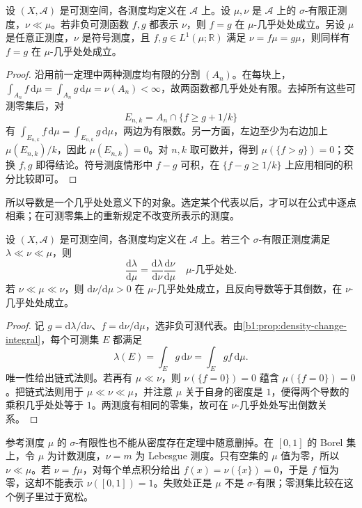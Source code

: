 \begin{proposition}\label{b1:prop:radon-nikodym-uniqueness}
设 \((X,\mathcal A)\) 是可测空间，各测度均定义在 \(\mathcal A\) 上。设 \(\mu,\nu\) 是 \(\mathcal A\) 上的 \(\sigma\)-有限正测度，\(\nu\ll\mu\)。若非负可测函数 \(f,g\) 都表示 \(\nu\)，则 \(f=g\) 在 \(\mu\)-几乎处处成立。另设 \(\mu\) 是任意正测度，\(\nu\) 是符号测度，且 \(f,g\in L^1(\mu;\mathbb R)\) 满足 \(\nu=f\mu=g\mu\)，则同样有 \(f=g\) 在 \(\mu\)-几乎处处成立。
\end{proposition}
\begin{proof}
沿用前一定理中两种测度均有限的分割 \((A_n)\)。在每块上，\(\int_{A_n}f\,\mathrm d\mu=\int_{A_n}g\,\mathrm d\mu=\nu(A_n)<\infty\)，故两函数都几乎处处有限。去掉所有这些可测零集后，对
\[
E_{n,k}=A_n\cap\{f\geq g+1/k\}
\]
有 \(\int_{E_{n,k}}f\,\mathrm d\mu=\int_{E_{n,k}}g\,\mathrm d\mu\)，两边为有限数。另一方面，左边至少为右边加上 \(\mu(E_{n,k})/k\)，因此 \(\mu(E_{n,k})=0\)。对 \(n,k\) 取可数并，得到 \(\mu(\{f>g\})=0\)；交换 \(f,g\) 即得结论。符号测度情形中 \(f-g\) 可积，在 \(\{f-g\geq1/k\}\) 上应用相同的积分比较即可。
\end{proof}

所以导数是一个几乎处处意义下的对象。选定某个代表以后，才可以在公式中逐点相乘；在可测零集上的重新规定不改变所表示的测度。

\begin{proposition}[密度的链式法则]\label{b1:prop:radon-nikodym-chain}
设 \((X,\mathcal A)\) 是可测空间，各测度均定义在 \(\mathcal A\) 上。若三个 \(\sigma\)-有限正测度满足 \(\lambda\ll\nu\ll\mu\)，则
\[
\frac{\mathrm d\lambda}{\mathrm d\mu}
=\frac{\mathrm d\lambda}{\mathrm d\nu}\frac{\mathrm d\nu}{\mathrm d\mu}
\quad\mu\text{-几乎处处}.
\]
若 \(\nu\ll\mu\ll\nu\)，则 \(\mathrm d\nu/\mathrm d\mu>0\) 在 \(\mu\)-几乎处处成立，且反向导数等于其倒数，在 \(\nu\)-几乎处处成立。
\end{proposition}
\begin{proof}
记 \(g=\mathrm d\lambda/\mathrm d\nu\)、\(f=\mathrm d\nu/\mathrm d\mu\)，选非负可测代表。由\cref{b1:prop:density-change-integral}，每个可测集 \(E\) 都满足
\[
\lambda(E)=\int_Eg\,\mathrm d\nu=\int_Egf\,\mathrm d\mu.
\]
唯一性给出链式法则。若再有 \(\mu\ll\nu\)，则 \(\nu(\{f=0\})=0\) 蕴含 \(\mu(\{f=0\})=0\)。把链式法则用于 \(\mu\ll\nu\ll\mu\)，并注意 \(\mu\) 关于自身的密度是 \(1\)，便得两个导数的乘积几乎处处等于 \(1\)。两测度有相同的零集，故可在 \(\nu\)-几乎处处写出倒数关系。
\end{proof}

参考测度 \(\mu\) 的 \(\sigma\)-有限性也不能从密度存在定理中随意删掉。在 \([0,1]\) 的 Borel 集上，令 \(\mu\) 为计数测度，\(\nu=m\) 为 Lebesgue 测度。只有空集的 \(\mu\) 值为零，所以 \(\nu\ll\mu\)。若 \(\nu=f\mu\)，对每个单点积分给出 \(f(x)=\nu(\{x\})=0\)，于是 \(f\) 恒为零，这却不能表示 \(\nu([0,1])=1\)。失败处正是 \(\mu\) 不是 \(\sigma\)-有限；零测集比较在这个例子里过于宽松。

